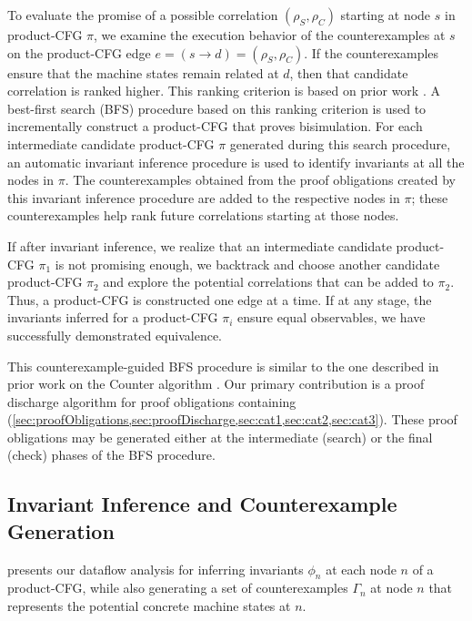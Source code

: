 To evaluate the promise of a possible correlation
$(\rho_S,\rho_C)$ starting at node $s$
in product-CFG $\pi$,
we examine the execution
behavior of the counterexamples at $s$ on
the product-CFG edge $e=(s\rightarrow d)=(\rho_S,\rho_C)$.
If the counterexamples ensure that the machine
states remain
related at $d$, then that candidate correlation
is ranked higher.
This ranking criterion is based on prior work \cite{oopsla20}.
A best-first search (BFS) procedure based on this ranking
criterion is used to incrementally construct
a product-CFG that proves bisimulation.
For each intermediate candidate product-CFG $\pi$ generated
during this search procedure,
an automatic invariant inference procedure is used
to identify invariants at all the nodes in $\pi$.
The counterexamples
obtained from the proof obligations created
by this invariant inference procedure are added to the
respective nodes in $\pi$; these counterexamples
help rank future correlations starting at those
nodes.

If after invariant inference,
we realize that an intermediate candidate product-CFG $\pi_1$
is not promising enough,
we backtrack and choose another
candidate product-CFG $\pi_2$ and explore the potential correlations that
can be added to $\pi_2$.
Thus, a product-CFG is constructed one edge at a time.
If at any stage, the invariants inferred for a product-CFG
$\pi_i$ ensure equal
observables, we have successfully demonstrated equivalence.

This counterexample-guided BFS procedure
is similar to the one described in prior work on
the Counter algorithm \cite{oopsla20}. Our
primary contribution is a proof discharge
algorithm for proof obligations containing
\recursiveRelations{}
(\cref{sec:proofObligations,sec:proofDischarge,sec:cat1,sec:cat2,sec:cat3}).
These proof obligations may
be generated either at the intermediate (search) or
the final (check)
phases of the BFS procedure.




\subsection{Invariant Inference and Counterexample Generation}
\label{sec:invinference}

 presents our dataflow analysis for inferring invariants $\phi_n$
at each node $n$ of a product-CFG, while also generating a set of counterexamples $\Gamma_n$ at node $n$
that represents the potential concrete machine states at $n$.

